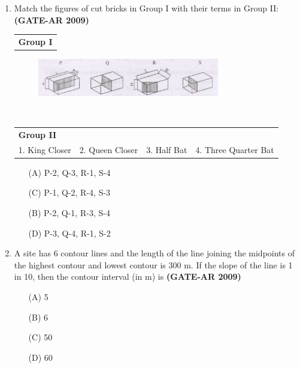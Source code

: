 \documentclass[a4paper,10pt]{article}
\begin{document}
\begin{enumerate}
\newpage

    \item Match the figures of cut bricks in Group I with their terms in Group II: \textbf{(GATE-AR 2009)} \\
    \begin{tabular}{ l }
	\textbf{Group I} \\
	\end{tabular}
	\begin{figure}[h!]
        \centering
        \includegraphics[width=0.75\textwidth]{Pic01.jpg}
	\end{figure} \\
	\begin{tabular}{ l l l l }
	\textbf{Group II} & & & \\
	1. King Closer & 2. Queen Closer & 3. Half Bat & 4. Three Quarter Bat \\
	\end{tabular}
	\begin{multicols}{2}
	\begin{itemize}
        \item[(A)] P-2, Q-3, R-1, S-4
        \item[(C)] P-1, Q-2, R-4, S-3
        \item[(B)] P-2, Q-1, R-3, S-4
        \item[(D)] P-3, Q-4, R-1, S-2
    \end{itemize}
	\end{multicols}

    \item A site has 6 contour lines and the length of the line joining the midpoints of the highest contour and lowest contour is 300 m. If the slope of the line is 1 in 10, then the contour interval (in m) is \textbf{(GATE-AR 2009)}
    \begin{multicols}{4}
	\begin{itemize}
        \item[(A)] 5
        \item[(B)] 6
        \item[(C)] 50
        \item[(D)] 60
    \end{itemize}
	\end{multicols}
	

\end{enumerate}
\end{document}
